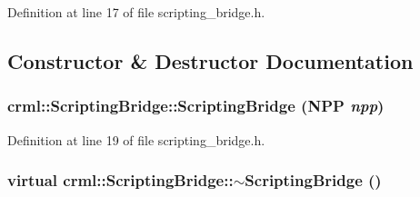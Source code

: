 Definition at line 17 of file scripting\_\-bridge.h.



\subsection{Constructor \& Destructor Documentation}
\hypertarget{classcrml_1_1_scripting_bridge_acffa45f2fbbf75e2899dad0715694965}{
\subsubsection[{ScriptingBridge}]{\setlength{\rightskip}{0pt plus 5cm}crml::ScriptingBridge::ScriptingBridge ({\bf NPP} {\em npp})}}
\label{classcrml_1_1_scripting_bridge_acffa45f2fbbf75e2899dad0715694965}


Definition at line 19 of file scripting\_\-bridge.h.

\hypertarget{classcrml_1_1_scripting_bridge_a2762a9e0d5c5c4c4e43b7740a88b4964}{
\subsubsection[{$\sim$ScriptingBridge}]{\setlength{\rightskip}{0pt plus 5cm}virtual crml::ScriptingBridge::$\sim$ScriptingBridge ()}}
\label{classcrml_1_1_scripting_bridge_a2762a9e0d5c5c4c4e43b7740a88b4964}


